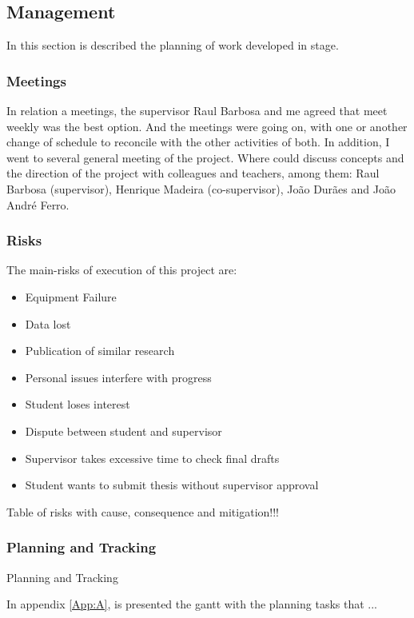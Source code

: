 \newpage
\subsection{Management}

In this section is described the planning of work developed in stage.

\subsubsection{Meetings}
In relation a meetings, the supervisor Raul Barbosa and me agreed that meet weekly was the best option. And the meetings were going on, with one or another change of schedule to reconcile with the other activities of both. In addition, I went to several general meeting of the project. Where could discuss concepts and the direction of the project with colleagues and teachers, among them: Raul Barbosa (supervisor), Henrique Madeira (co-supervisor), João Durães and João André Ferro.

\subsubsection{Risks}

The main-risks of execution of this project are:

\begin{itemize}
	\item Equipment Failure
	\item Data lost
	\item Publication of similar research
	\item Personal issues interfere with progress
	\item Student loses interest
	\item Dispute between student and supervisor
	\item Supervisor takes excessive time to check final drafts
	\item Student wants to submit thesis without supervisor approval
\end{itemize}

Table of risks with cause, consequence and mitigation!!!

\subsubsection{Planning and Tracking}
Planning and Tracking

In appendix \ref{App:A}, is presented the gantt with the planning tasks that ...

